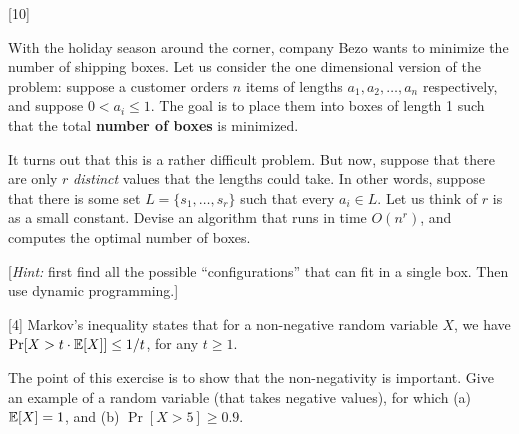 \documentclass[addpoints]{exam}
\begin{document}
\begin{questions}

[10]

With the holiday season around the corner, company Bezo wants to minimize the number of shipping boxes. Let us consider the one dimensional version of the problem: suppose a customer orders $n$ items of lengths $a_1, a_2, \dots, a_n$ respectively, and suppose $0 < a_i \le 1$. The goal is to place them into boxes of length 1 such that the total {\bf number of boxes} is minimized.  

It turns out that this is a rather difficult problem. But now, suppose that there are only $r$ {\em distinct} values that the lengths could take. In other words, suppose that there is some set $L = \{s_1, \dots, s_r\}$ such that every $a_i \in L$. Let us think of $r$ is as a small constant.  Devise an algorithm that runs in time $O(n^r)$, and computes the optimal number of boxes.

[{\em Hint:} first find all the possible ``configurations'' that can fit in a single box. Then use dynamic programming.] 

[4]
Markov's inequality states that for a non-negative random variable $X$, we have $\Pr[ X > t \cdot \mathbb{E}[X] ] \le 1/t$, for any $t \ge 1$. 

The point of this exercise is to show that the non-negativity is important. Give an example of a random variable (that takes negative values), for which (a) $\mathbb{E}[X] = 1$, and (b) $\Pr[ X > 5] \ge 0.9$.


\end{questions}
\end{document}
